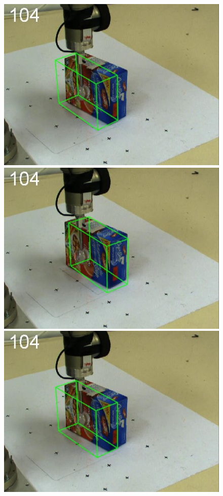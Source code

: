 \begin{figure}[t]
{\includegraphics[width=\imgCXwid]{./C1_1exp_87_2}
\includegraphics[width=\imgCXwid]{./C1_2exp_87_2}
\includegraphics[width=\imgCXwid]{./C1_LWPR1_87_2}
}
\end{figure}
